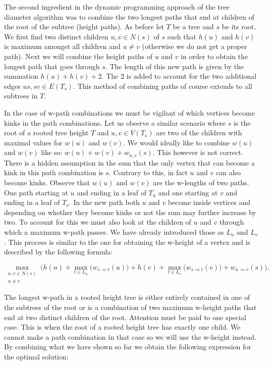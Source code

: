 The second ingredient in the dynamic programming approach of the tree diameter algorithm was to combine the two longest paths that end at children of the root of the subtree (height paths). As before let $T$ be a tree and $s$ be its root. We first find two distinct children $u, v \in N(s)$ of $s$ such that $h(u)$ and $h(v)$ is maximum amongst all children and $u \ne v$ (otherwise we do not get a proper path). Next we will combine the height paths of $u$ and $v$ in order to obtain the longest path that goes through $s$. The length of this new path is given by the summation $h(u) + h(v) + 2$. The $2$ is added to account for the two additional edges $us, sv \in E(T_s)$. This method of combining paths of course extends to all subtrees in $T$.

In the case of w-path combinations we must be vigilant of which vertices become kinks in the path combinations. Let us observe a similar scenario where $s$ is the root of a rooted tree height $T$ and $u, v \in V(T_s)$ are two of the children with maximal values for $w(u)$ and $w(v)$. We would ideally like to combine $w(u)$ and $w(v)$ like so: $w(u) + w(v) + w_{u, v}(s)$. This however is not correct. There is a hidden assumption in the sum that the only vertex that can become a kink in this path combination is $s$. Contrary to this, in fact $u$ and $v$ can also become kinks. Observe that $w(u) \text{ and } w(v)$ are the w-lengths of two paths. One path starting at $u$ and ending in a leaf of $T_u$ and one starting at $v$ and ending in a leaf of $T_v$. In the new path both $u$ and $v$ become inside vertices and depending on whether they become kinks or not the sum may further increase by two. To account for this we must also look at the children of $u$ and $v$ through which a maximum w-path passes. We have already introduced those as $L_u$ and $L_v$. This process is similar to the one for obtaining the w-height of a vertex and is described by the following formula:

$$ \max\limits_{\substack{u, v \in N(s) \\ u \ne v}}\bigg( h(u) + \max\limits_{t \in L_u}\Big(w_{s \rightsquigarrow t}(u)\Big) + h(v) + \max\limits_{t \in L_v}\Big(w_{s \rightsquigarrow t}(v)\Big) + w_{u \rightsquigarrow v}(s)\bigg). $$

The longest w-path in a rooted height tree is either entirely contained in one of the subtrees of the root or is a combination of two maximum w-height paths that end at two distinct children of the root. Attention must be paid to one special case. This is when the root of a rooted height tree has exactly one child. We cannot make a path combination in that case so we will use the w-height instead. By combining what we have shown so far we obtain the following expression for the optimal solution:

